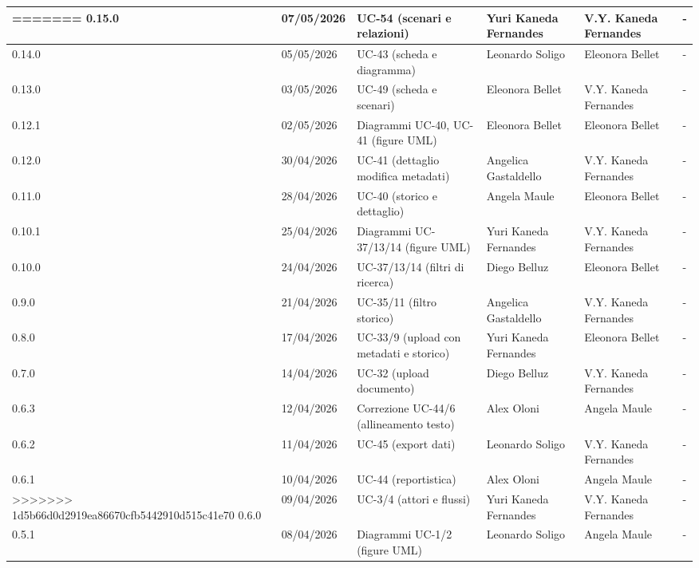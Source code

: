 ﻿\documentclass[a4paper,12pt]{article}
\begin{document}
{\begin{longtable}{|p{1.2cm}|p{1.9cm}|p{4.3cm}|p{2.8cm}|p{2.1cm}|p{2.1cm}|}
=======
    0.15.0 & 07/05/2026 & UC-54 (scenari e relazioni) & Yuri Kaneda Fernandes & V.Y. Kaneda Fernandes & - \\
    \hline
    \rowcolor{gray!8} 0.14.0 & 05/05/2026 & UC-43 (scheda e diagramma) & Leonardo Soligo & Eleonora Bellet & - \\
    \hline
    0.13.0 & 03/05/2026 & UC-49 (scheda e scenari) & Eleonora Bellet & V.Y. Kaneda Fernandes & - \\
    \hline
    \rowcolor{gray!8} 0.12.1 & 02/05/2026 & Diagrammi UC-40, UC-41 (figure UML) & Eleonora Bellet & Eleonora Bellet & - \\
    \hline
    0.12.0 & 30/04/2026 & UC-41 (dettaglio modifica metadati) & Angelica Gastaldello & V.Y. Kaneda Fernandes & - \\
    \hline
    \rowcolor{gray!8} 0.11.0 & 28/04/2026 & UC-40 (storico e dettaglio) & Angela Maule & Eleonora Bellet & - \\
    \hline
    \rowcolor{gray!8} 0.10.1 & 25/04/2026 & Diagrammi UC-37/13/14 (figure UML) & Yuri Kaneda Fernandes & V.Y. Kaneda Fernandes & - \\
    \hline
    0.10.0 & 24/04/2026 & UC-37/13/14 (filtri di ricerca) & Diego Belluz & Eleonora Bellet & - \\
    \hline
    \rowcolor{gray!8} 0.9.0 & 21/04/2026 & UC-35/11 (filtro storico) & Angelica Gastaldello & V.Y. Kaneda Fernandes & - \\
    \hline
    \rowcolor{gray!8} 0.8.0 & 17/04/2026 & UC-33/9 (upload con metadati e storico) & Yuri Kaneda Fernandes & Eleonora Bellet & - \\
    \hline
    0.7.0 & 14/04/2026 & UC-32 (upload documento) & Diego Belluz & V.Y. Kaneda Fernandes & - \\
    \hline
    0.6.3 & 12/04/2026 & Correzione UC-44/6 (allineamento testo) & Alex Oloni & Angela Maule & - \\
    \hline
    \rowcolor{gray!8} 0.6.2 & 11/04/2026 & UC-45 (export dati) & Leonardo Soligo & V.Y. Kaneda Fernandes & - \\
    \hline
    0.6.1 & 10/04/2026 & UC-44 (reportistica) & Alex Oloni & Angela Maule & - \\
>>>>>>> 1d5b66d0d2919ea86670cfb5442910d515c41e70
    \hline
    \rowcolor{gray!8} 0.6.0 & 09/04/2026 & UC-3/4 (attori e flussi) & Yuri Kaneda Fernandes & V.Y. Kaneda Fernandes & - \\
    \hline
    0.5.1 & 08/04/2026 & Diagrammi UC-1/2 (figure UML) & Leonardo Soligo & Angela Maule & - \\

\end{longtable}}
\end{document}
